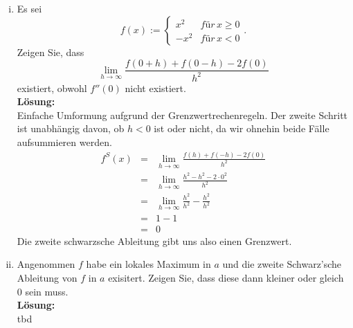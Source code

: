 \documentclass[11pt,a4paper,ngerman]{article}
\begin{document}
\begin{enumerate}[(i)]
    \item Es sei
        $$
            f(x) := \left\{ \begin{array}{lr} x^2 & für \, x\geq 0 \\ -x^2 & für \, x<0\end{array}\right. .
        $$
        Zeigen Sie, dass
        $$
            \underset{h \rightarrow \infty}{\lim} \frac{f(0+h) + f(0-h) - 2f(0)}{h^2}
        $$
        existiert, obwohl $f''(0)$ nicht existiert.\\
    \textbf{Lösung:}\\
        Einfache Umformung aufgrund der Grenzwertrechenregeln. Der zweite Schritt ist unabhängig
        davon, ob $h<0$ ist oder nicht, da wir ohnehin beide Fälle aufsummieren werden.
        $$\begin{array}{rcl}
            f^S(x) &=& \underset{h \rightarrow \infty}{\lim} \frac{f(h) + f(-h) - 2f(0)}{h^2}\\
                &=& \underset{h \rightarrow \infty}{\lim} \frac{h^2 - h^2 -2\cdot 0^2}{h^2}\\
                &=& \underset{h \rightarrow \infty}{\lim} \frac{h^2}{h^2} - \frac{h^2}{h^2}\\
                &=& 1 - 1\\
                &=& 0
        \end{array}$$
        Die zweite schwarzsche Ableitung gibt uns also einen Grenzwert.

    \item Angenommen $f$ habe ein lokales Maximum in $a$ und die zweite Schwarz'sche Ableitung von $f$
        in $a$ exisitert. Zeigen Sie, dass diese dann kleiner oder gleich 0 sein muss.\\
    \textbf{Lösung:}\\
        tbd
\end{enumerate}

\label{LastPage}
\end{document}
